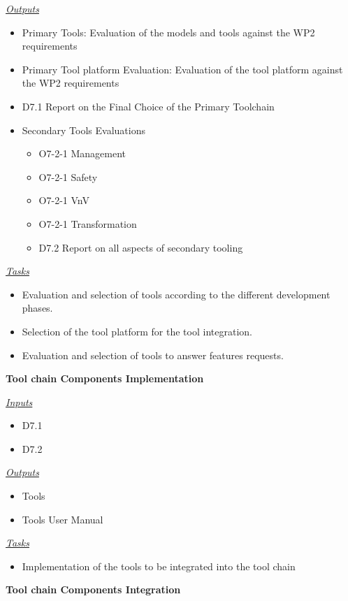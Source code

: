 \documentclass{template/openetcs_article}
\begin{document}
\begin{description}
\underline{\textit{Outputs}}
\begin{itemize}
\item Primary Tools: Evaluation of the models and tools against the WP2 requirements
\item Primary Tool platform  Evaluation: Evaluation of the tool platform against the WP2
requirements
\item D7.1 Report on the Final Choice of the Primary Toolchain
\item Secondary Tools Evaluations
\begin{itemize}
\item O7-2-1 Management
\item O7-2-1 Safety
\item O7-2-1 VnV
\item O7-2-1 Transformation
\item D7.2 Report on all aspects of secondary tooling
\end{itemize}
\end{itemize}

\underline{\textit{Tasks}}
\begin{itemize}
\item Evaluation and selection of tools according to the different
  development phases.
\item Selection of the tool platform for the tool integration.
\item Evaluation and selection of tools to answer features requests.
\end{itemize}

\item \textbf{Tool chain Components Implementation}

\underline{\textit{Inputs}}
\begin{itemize}
\item D7.1
\item D7.2
\end{itemize}


\underline{\textit{Outputs}}
\begin{itemize}
\item Tools
\item Tools User Manual 
\end{itemize}

\underline{\textit{Tasks}}
\begin{itemize}
\item Implementation of the tools to be integrated into the tool chain
\end{itemize}

\item \textbf{Tool chain Components Integration}


\end{description}
\end{document}
